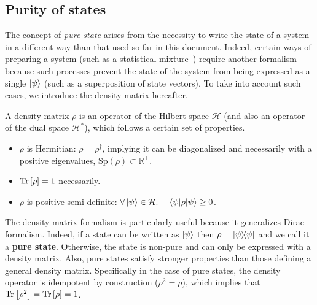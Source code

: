 \subsection{Purity of states}\label{sec:purity}
The concept of \textit{pure state} arises from the necessity to write the state of a system in a different way than that used so far in this document. Indeed, certain ways of preparing a system (such as a statistical mixture~\cite{CT}) require another formalism because such processes prevent the state of the system from being expressed as a single $\ket{\psi}$ (such as a superposition of state vectors). To take into account such cases, we introduce the density matrix hereafter.

A density matrix $\rho$ is an operator of the Hilbert space $\mathcal{H}$ (and also an operator of the dual space $\mathcal{H^*}$), which follows a certain set of properties.\label{prop:rho}
\begin{itemize}
    \item $\rho$ is Hermitian: $\rho=\rho^\dagger$, implying it can be diagonalized and necessarily with a positive eigenvalues, $\mathrm{Sp}(\rho)\subset\mathbb{R^+}$.
    \item $\operatorname{Tr}\left[\rho\right]=1$ necessarily.
    \item $\rho$ is positive semi-definite: $\forall\ket{\psi}\in\mathcal{H},\quad \expval{\rho}{\psi}\geq 0$.
\end{itemize}
The density matrix formalism is particularly useful because it generalizes Dirac formalism. Indeed, if a state can be written as $\ket{\psi}$ then $\rho=\ketbra{\psi}$ and we call it a \textbf{pure state}. Otherwise, the state is non-pure and can only be expressed with a density matrix. Also, pure states satisfy stronger properties than those defining a general density matrix. Specifically in the case of pure states, the density operator is idempotent by construction ($\rho^2=\rho$), which implies that $\operatorname{Tr}\left[\rho^2\right]=\operatorname{Tr}\left[\rho\right]=1$.
